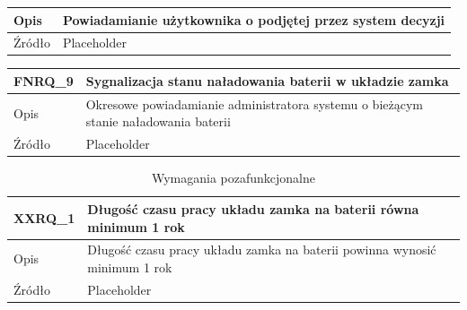 \begin{table}[h!]
\begin{subtable}[c]{\textwidth}
\begin{tabular}{|p{2cm}|p{12cm}|}
                    \hline \cellcolor[gray]{0.8} Opis         & Powiadamianie użytkownika o podjętej przez system decyzji \\
                    \hline \cellcolor[gray]{0.8} Źródło       & Placeholder    \\
                    \hline
                \end{tabular}
                \label{tbl:fnrq8}
                \vspace{10mm}           
            \end{subtable}
        \quad%
            \begin{subtable}[c]{\textwidth}
                \centering
                 \begin{tabular}{|p{2cm}|p{12cm}|}
                    \hline FNRQ\_9      & \textbf{Sygnalizacja stanu naładowania baterii w układzie zamka} \\
                    \hline \cellcolor[gray]{0.8} Opis         & Okresowe powiadamianie administratora systemu o bieżącym stanie naładowania baterii \\
                    \hline \cellcolor[gray]{0.8} Źródło       & Placeholder    \\
                    \hline
                \end{tabular}
                \label{tbl:fnrq9}         
            \end{subtable}
            \label{tbl:fnrq_2}
        \end{table}

        \begin{table}
            \caption{Wymagania pozafunkcjonalne}
            \centering
            \begin{subtable}[c]{\textwidth}
                \centering
                \begin{tabular}{|p{2cm}|p{12cm}|}
                    \hline XXRQ\_1      & \textbf{Długość czasu pracy układu zamka na baterii równa minimum 1 rok}  \\
                    \hline \cellcolor[gray]{0.8} Opis         & Długość czasu pracy układu zamka na baterii powinna wynosić minimum 1 rok \\
                    \hline \cellcolor[gray]{0.8} Źródło       & Placeholder    \\
                    \hline
                \end{tabular}
                \label{tbl:xxrq1}   
                \vspace{10mm}         
            \end{subtable}
            \label{tbl:xxrq}
        \end{table}

